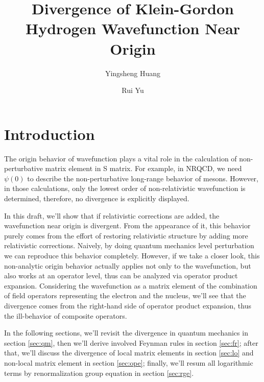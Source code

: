 \documentclass[aps,prd,preprint,showkeys,10pt]{revtex4-1}
\begin{document}
\title{Divergence of Klein-Gordon Hydrogen Wavefunction Near Origin}
\author{Yingsheng Huang}
\author{Rui Yu}

\begin{abstract}

\end{abstract}
\keywords{}

\maketitle

\section*{Introduction}
The origin behavior of wavefunction plays a vital role in the calculation of non-perturbative matrix element in S matrix. For example, in NRQCD, we need $\psi(0)$ to describe the non-perturbative long-range behavior of mesons. However, in those calculations, only the lowest order of non-relativistic wavefunction is determined, therefore, no divergence is explicitly displayed.

In this draft, we'll show that if relativistic corrections are added, the wavefunction near origin is divergent. From the appearance of it, this behavior purely comes from the effort of restoring relativistic structure by adding more relativistic corrections. Naively, by doing quantum mechanics level perturbation we can reproduce this behavior completely. However, if we take a closer look, this non-analytic origin behavior actually applies not only to the wavefunction, but also works at an operator level, thus can be analyzed via operator product expansion. Considering the wavefunction as a matrix element of the combination of field operators representing the electron and the nucleus, we'll see that the divergence comes from the right-hand side of operator product expansion, thus the ill-behavior of composite operators.

In the following sections, we'll revisit the divergence in quantum mechanics in section \ref{sec:qm}, then we'll derive involved Feynman rules in section \ref{sec:fr}; after that, we'll discuss the divergence of local matrix elements in section \ref{sec:lo} and non-local matrix element in section \ref{sec:ope}; finally, we'll resum all logarithmic terms by renormalization group equation in section \ref{sec:rge}.
\end{document}

